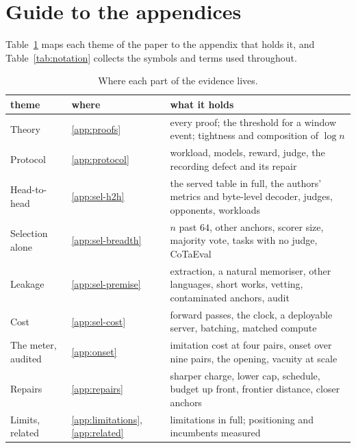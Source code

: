 \documentclass{article}
\begin{document}
\appendix
\small
\clearpage
\section*{Guide to the appendices}\label{app:guide}
\noindent Table~\ref{tab:guide} maps each theme of the paper to the appendix that holds it, and
Table~\ref{tab:notation} collects the symbols and terms used throughout.

\begin{table}[!ht]
\centering\footnotesize
\caption{Where each part of the evidence lives.}\label{tab:guide}
\begin{tabular}{@{}p{}p{}p{}@{}}
\toprule
theme & where & what it holds \\
\midrule
Theory & \ref{app:proofs} & every proof; the threshold for a window event; tightness and composition of $\log n$ \\
Protocol & \ref{app:protocol} & workload, models, reward, judge, the recording defect and its repair \\
Head-to-head & \ref{app:sel-h2h} & the served table in full, the authors' metrics and byte-level decoder, judges, opponents, workloads \\
Selection alone & \ref{app:sel-breadth} & $n$ past $64$, other anchors, scorer size, majority vote, tasks with no judge, CoTaEval \\
Leakage & \ref{app:sel-premise} & extraction, a natural memoriser, other languages, short works, vetting, contaminated anchors, audit \\
Cost & \ref{app:sel-cost} & forward passes, the clock, a deployable server, batching, matched compute \\
The meter, audited & \ref{app:onset} & imitation cost at four pairs, onset over nine pairs, the opening, vacuity at scale \\
Repairs & \ref{app:repairs} & sharper charge, lower cap, schedule, budget up front, frontier distance, closer anchors \\
Limits, related & \ref{app:limitations}, \ref{app:related} & limitations in full; positioning and incumbents measured \\
\bottomrule
\end{tabular}
\end{table}
\end{document}
